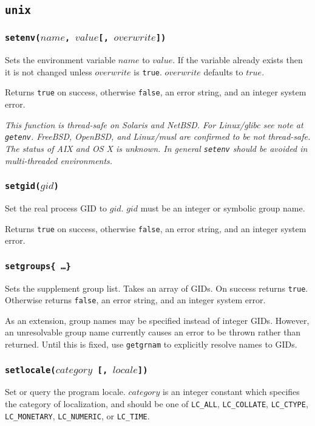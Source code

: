\documentclass[11pt, oneside]{memoir}
\newcommand*{\true}[0]{\texttt{true}\xspace}
\newcommand*{\false}[0]{\texttt{false}\xspace}
\newcommand*{\fn}[1]{\texttt{#1}\xspace}
\newcounter{toccols}
\newenvironment{Module}[1]{
	\subsection{\texttt{#1}}
	\addtocontents{toc}{
		\protect\begin{multicols}{\value{toccols}}
	}
}{
	\addtocontents{toc}{\protect\end{multicols}}
}
\begin{document}
\begin{Module}{unix}
\subsubsection[\fn{setenv}]{\fn{setenv($name$, $value$[, $overwrite$])}}

Sets the environment variable $name$ to $value$. If the variable already exists then it is not changed unless $overwrite$ is \true. $overwrite$ defaults to $true$.

Returns \true on success, otherwise \false, an error string, and an integer system error.

\emph{This function is thread-safe on Solaris and NetBSD. For Linux/glibc see note at \fn{getenv}. FreeBSD, OpenBSD, and Linux/musl are confirmed to be not thread-safe. The status of AIX and OS X is unknown. In general \fn{setenv} should be avoided in multi-threaded environments.}

\subsubsection[\fn{setgid}]{\fn{setgid($gid$)}}

Set the real process GID to $gid$. $gid$ must be an integer or symbolic group name.

Returns \true on success, otherwise \false, an error string, and an integer system error.

\subsubsection[\fn{setgroups}]{\fn{setgroups\{ \ldots \}}}

Sets the supplement group list. Takes an array of GIDs. On success returns \true. Otherwise returns \false, an error string, and an integer system error.

As an extension, group names may be specified instead of integer GIDs. However, an unresolvable group name currently causes an error to be thrown rather than returned. Until this is fixed, use \fn{getgrnam} to explicitly resolve names to GIDs.

\subsubsection[\fn{setlocale}]{\fn{setlocale($category$ [, $locale$])}}

Set or query the program locale. $category$ is an integer constant which specifies the category of localization, and should be one of \texttt{LC\_ALL}, \texttt{LC\_COLLATE}, \texttt{LC\_CTYPE}, \texttt{LC\_MONETARY}, \texttt{LC\_NUMERIC}, or \texttt{LC\_TIME}.


\end{Module}
\end{document}

